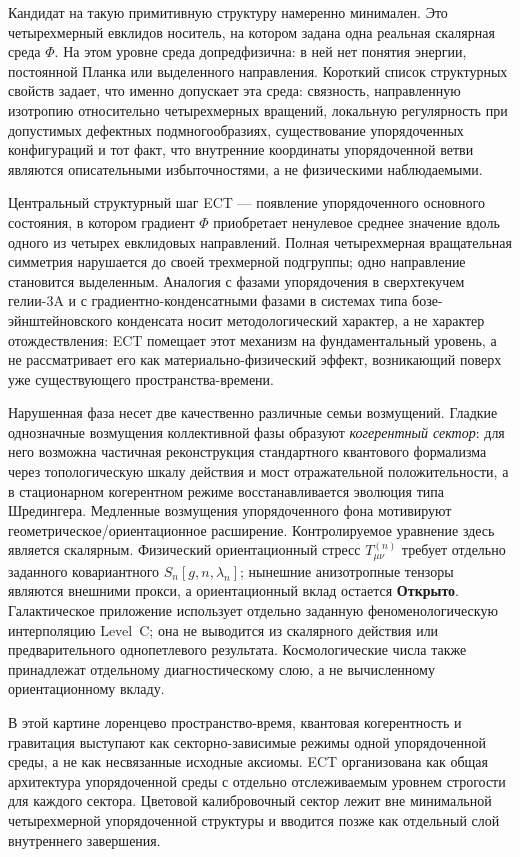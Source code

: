 \documentclass[11pt,a4paper]{article}
\newcommand{\statO}{\textbf{Открыто}}
\begin{document}
Кандидат на такую примитивную структуру намеренно минимален.
Это четырехмерный евклидов носитель, на котором задана одна
реальная скалярная среда $\Phi$. На этом уровне среда
допредфизична: в ней нет понятия энергии, постоянной Планка или
выделенного направления. Короткий список структурных свойств
задает, что именно допускает эта среда: связность, направленную
изотропию относительно четырехмерных вращений, локальную
регулярность при допустимых дефектных подмногообразиях,
существование упорядоченных конфигураций и тот факт, что
внутренние координаты упорядоченной ветви являются
описательными избыточностями, а не физическими наблюдаемыми.

Центральный структурный шаг ECT — появление упорядоченного
основного состояния, в котором градиент $\Phi$ приобретает
ненулевое среднее значение вдоль одного из четырех евклидовых
направлений. Полная четырехмерная вращательная симметрия
нарушается до своей трехмерной подгруппы; одно направление
становится выделенным. Аналогия с фазами упорядочения в
сверхтекучем гелии-3A и с градиентно-конденсатными фазами в
системах типа бозе-эйнштейновского конденсата носит
методологический характер, а не характер отождествления: ECT
помещает этот механизм на фундаментальный уровень, а не
рассматривает его как материально-физический эффект, возникающий
поверх уже существующего пространства-времени.

Нарушенная фаза несет две качественно различные семьи
возмущений. Гладкие однозначные возмущения коллективной фазы
образуют \emph{когерентный сектор}: для него возможна частичная
реконструкция стандартного квантового формализма через
топологическую шкалу действия и мост отражательной
положительности, а в стационарном когерентном режиме
восстанавливается эволюция типа Шредингера. Медленные возмущения упорядоченного фона мотивируют
геометрическое/ориентационное расширение.  Контролируемое уравнение
здесь является скалярным.  Физический ориентационный стресс
$T^{(n)}_{\mu\nu}$ требует отдельно заданного ковариантного
$S_n[g,n,\lambda_n]$; нынешние анизотропные тензоры являются внешними
прокси, а ориентационный вклад остается \statO{}. Галактическое приложение использует отдельно заданную
феноменологическую интерполяцию Level~C; она не выводится из
скалярного действия или предварительного однопетлевого результата.
Космологические числа также принадлежат отдельному диагностическому
слою, а не вычисленному ориентационному вкладу.

В этой картине лоренцево пространство-время, квантовая
когерентность и гравитация выступают как
секторно-зависимые режимы одной упорядоченной среды, а не как
несвязанные исходные аксиомы.
ECT организована как общая архитектура упорядоченной среды с
отдельно отслеживаемым уровнем строгости для каждого сектора.
Цветовой калибровочный сектор лежит вне минимальной
четырехмерной упорядоченной структуры и вводится позже как
отдельный слой внутреннего завершения.
\end{document}
